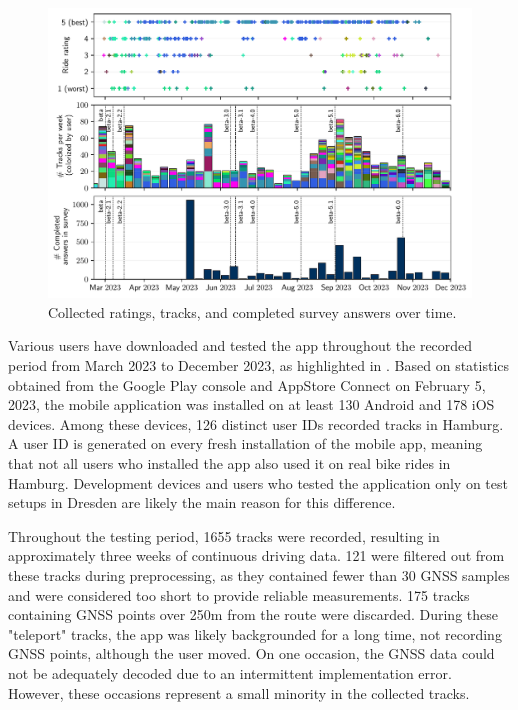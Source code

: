 \begin{figure}[!b]
\caption{Collected ratings, tracks, and completed survey answers over time.}\label{fig:app-usage-over-time}
\includegraphics[width=\linewidth]{images/app-usage-over-time.pdf}
\end{figure}

Various users have downloaded and tested the app throughout the recorded period from March 2023 to December 2023, as highlighted in . Based on statistics obtained from the Google Play console and AppStore Connect on February 5, 2023, the mobile application was installed on at least 130 Android and 178 iOS devices. Among these devices, 126 distinct user IDs recorded tracks in Hamburg. A user ID is generated on every fresh installation of the mobile app, meaning that not all users who installed the app also used it on real bike rides in Hamburg. Development devices and users who tested the application only on test setups in Dresden are likely the main reason for this difference.

Throughout the testing period, 1655 tracks were recorded, resulting in approximately three weeks of continuous driving data. 121 were filtered out from these tracks during preprocessing, as they contained fewer than 30 GNSS samples and were considered too short to provide reliable measurements. 175 tracks containing GNSS points over 250m from the route were discarded. During these "teleport" tracks, the app was likely backgrounded for a long time, not recording GNSS points, although the user moved. On one occasion, the GNSS data could not be adequately decoded due to an intermittent implementation error. However, these occasions represent a small minority in the collected tracks.

